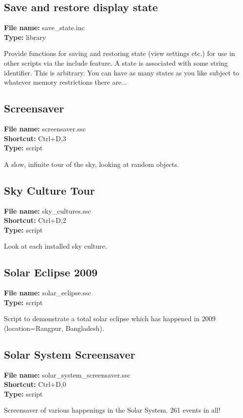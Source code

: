 \subsection{Save and restore display state}
\textbf{File name:} save\_state.inc \\
\textbf{Type:} library

Provide functions for saving and restoring state (view settings etc.) for use in other scripts via the include feature.  A state is associated with some string identifier.  This is arbitrary.  You can have as many states as you like subject to whatever memory restrictions there are...

\subsection{Screensaver}
\textbf{File name:} screensaver.ssc \\
\textbf{Shortcut:} Ctrl+D,3 \\
\textbf{Type:} script

A slow, infinite tour of the sky, looking at random objects.

\subsection{Sky Culture Tour}
\textbf{File name:} sky\_cultures.ssc \\
\textbf{Shortcut:} Ctrl+D,2 \\
\textbf{Type:} script

Look at each installed sky culture.

\subsection{Solar Eclipse 2009}
\textbf{File name:} solar\_eclipse.ssc \\
\textbf{Type:} script

Script to demonstrate a total solar eclipse which has happened in 2009 (location=Rangpur, Bangladesh).

\subsection{Solar System Screensaver}
\textbf{File name:} solar\_system\_screensaver.ssc \\
\textbf{Shortcut:} Ctrl+D,0 \\
\textbf{Type:} script

Screensaver of various happenings in the Solar System. 261 events in all!

